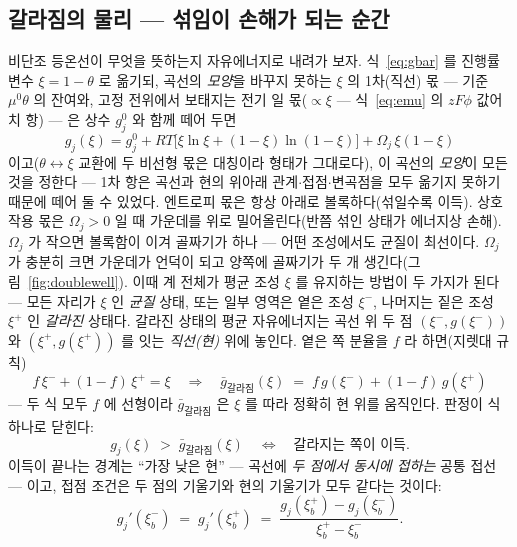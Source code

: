 \documentclass[11pt,a4paper]{article}
\begin{document}
\subsection{갈라짐의 물리 — 섞임이 손해가 되는 순간}
비단조 등온선이 무엇을 뜻하는지 자유에너지로 내려가 보자. 식~\eqref{eq:gbar} 를 진행률 변수
$\xi=1-\theta$ 로 옮기되, 곡선의 \emph{모양}을 바꾸지 못하는 $\xi$ 의 1차(직선) 몫 — 기준
$\mu^0\theta$ 의 잔여와, 고정 전위에서 보태지는 전기 일 몫($\propto\xi$ — 식~\eqref{eq:emu}
의 $zF\phi$ 값어치 항) — 은 상수 $g_j^0$ 와 함께 떼어 두면
\begin{equation}
g_j(\xi)=g_j^0+RT\big[\xi\ln\xi+(1-\xi)\ln(1-\xi)\big]+\Omega_j\,\xi(1-\xi)
\label{eq:gxi}
\end{equation}
이고($\theta\leftrightarrow\xi$ 교환에 두 비선형 몫은 대칭이라 형태가 그대로다), 이 곡선의
\emph{모양}이 모든 것을 정한다 — 1차 항은 곡선과 현의 위아래 관계$\cdot$접점$\cdot$변곡점을 모두
옮기지 못하기 때문에 떼어 둘 수 있었다. 엔트로피 몫은 항상 아래로 볼록하다(섞일수록 이득). 상호작용 몫은
$\Omega_j>0$ 일 때 가운데를 위로 밀어올린다(반쯤 섞인 상태가 에너지상 손해). $\Omega_j$ 가 작으면 볼록함이
이겨 골짜기가 하나 — 어떤 조성에서도 균질이 최선이다. $\Omega_j$ 가 충분히 크면 가운데가 언덕이 되고 양쪽에
골짜기가 두 개 생긴다(그림~\ref{fig:doublewell}). 이때 계 전체가 평균 조성 $\xi$ 를 유지하는 방법이 두
가지가 된다 — 모든 자리가 $\xi$ 인 \emph{균질} 상태, 또는 일부 영역은 옅은 조성 $\xi^-$, 나머지는 짙은
조성 $\xi^+$ 인 \emph{갈라진} 상태다. 갈라진 상태의 평균 자유에너지는 곡선 위 두 점 $(\xi^-,g(\xi^-))$
와 $(\xi^+,g(\xi^+))$ 를 잇는 \emph{직선(현)} 위에 놓인다. 옅은 쪽 분율을 $f$ 라 하면(지렛대 규칙)
\begin{equation}
f\,\xi^-+(1-f)\,\xi^+=\xi
\quad\Rightarrow\quad
\bar g_{\text{갈라짐}}(\xi)\;=\;f\,g(\xi^-)+(1-f)\,g(\xi^+)
\label{eq:lever}
\end{equation}
— 두 식 모두 $f$ 에 선형이라 $\bar g_{\text{갈라짐}}$ 은 $\xi$ 를 따라 정확히 현 위를 움직인다.
판정이 식 하나로 닫힌다:
\begin{equation}
g_j(\xi)\;>\;\bar g_{\text{갈라짐}}(\xi)
\quad\Longleftrightarrow\quad
\text{갈라지는 쪽이 이득.}
\label{eq:chordtest}
\end{equation}
이득이 끝나는 경계는 ``가장 낮은 현'' — 곡선에 \emph{두 점에서 동시에 접하는} 공통 접선 — 이고,
접점 조건은 두 점의 기울기와 현의 기울기가 모두 같다는 것이다:
\begin{equation}
g_j'(\xi_b^-)\;=\;g_j'(\xi_b^+)
\;=\;\frac{g_j(\xi_b^+)-g_j(\xi_b^-)}{\xi_b^+-\xi_b^-}.
\label{eq:cotangent}
\end{equation}
\end{document}
